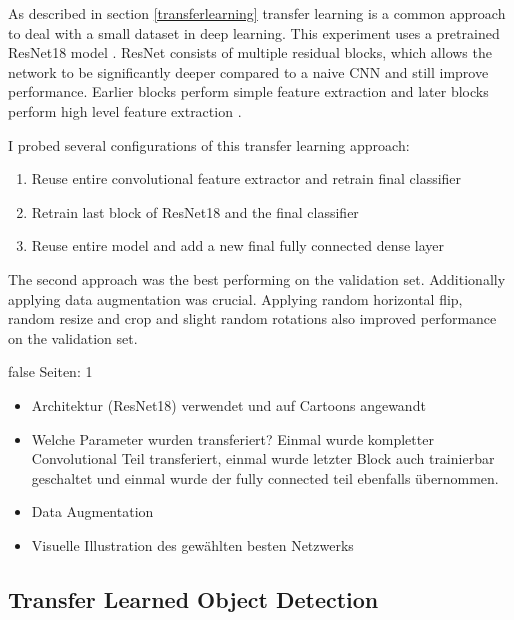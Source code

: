 \documentclass[draft,final,oneside]{vutinfth} %
\begin{document}
As described in section \ref{transferlearning} transfer learning is a common approach to deal with a small dataset in deep learning. This experiment uses a pretrained ResNet18 model \cite{resnet}. ResNet consists of multiple residual blocks, which allows the network to be significantly deeper compared to a naive CNN and still improve performance. Earlier blocks perform simple feature extraction and later blocks perform high level feature extraction \cite{resnet}. 

I probed several configurations of this transfer learning approach:

\begin{enumerate}
\item Reuse entire convolutional feature extractor and retrain final classifier
\item Retrain last block of ResNet18 and the final classifier
\item Reuse entire model and add a new final fully connected dense layer
\end{enumerate}

The second approach was the best performing on the validation set. Additionally applying data augmentation was crucial. Applying random horizontal flip, random resize and crop and slight random rotations also improved performance on the validation set.

\if false
Seiten: 1

\begin{itemize}
\item Architektur (ResNet18) verwendet und auf Cartoons angewandt
\item Welche Parameter wurden transferiert? Einmal wurde kompletter Convolutional Teil transferiert, einmal wurde letzter Block auch trainierbar geschaltet und einmal wurde der fully connected teil ebenfalls übernommen.
\item Data Augmentation
\item Visuelle Illustration des gewählten besten Netzwerks

\end{itemize}
\fi


\subsection{Transfer Learned Object Detection}
\end{document}
